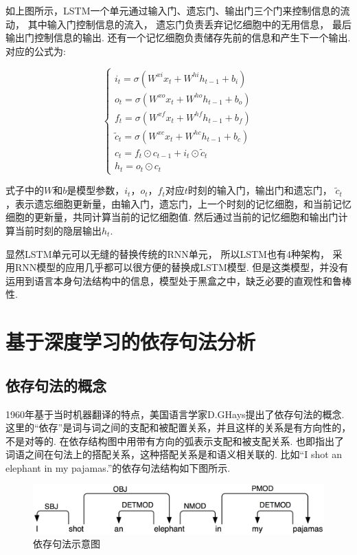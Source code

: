 \documentclass[bachelor,winfonts]{jnuthesis}
\begin{document}
如上图所示，LSTM一个单元通过输入门、遗忘门、输出门三个门来控制信息的流动，
其中输入门控制信息的流入，
遗忘门负责丢弃记忆细胞中的无用信息，
最后输出门控制信息的输出.
还有一个记忆细胞负责储存先前的信息和产生下一个输出.
对应的公式为:

\begin{equation}
  \left\{
  \begin{array}{l}
   i_{t} = \sigma(W^{xi}x_{t}+W^{hi}h_{t-1}+b_{i}) \\ 
   o_{t} = \sigma(W^{xo}x_{t}+W^{ho}h_{t-1}+b_{o}) \\ 
   f_{t} = \sigma(W^{xf}x_{t}+W^{hf}h_{t-1}+b_{f}) \\ 
   \widetilde{c}_{t} = \sigma(W^{xc}x_{t}+W^{hc}h_{t-1}+b_{c}) \\
   c_{t} = f_{t} \odot c_{t-1} + i_{t} \odot \widetilde{c}_{t} \\
   h_{t} = o_{t} \odot c_{t}
  \end{array}
  \right.
\end{equation}

式子中的$W$和$b$是模型参数，$i_{t}$，$o_{t}$，$f_{t}$对应$t$时刻的输入门，输出门和遗忘门，
$\widetilde{c}_{t}$，表示遗忘细胞更新量，由输入门，遗忘门，上一个时刻的记忆细胞，和当前记忆细胞的更新量，共同计算当前的记忆细胞值.
然后通过当前的记忆细胞和输出门计算当前时刻的隐层输出$h_{t}$.

显然LSTM单元可以无缝的替换传统的RNN单元，
所以LSTM也有4种架构，
采用RNN模型的应用几乎都可以很方便的替换成LSTM模型.
但是这类模型，并没有运用到语言本身句法结构中的信息，模型处于黑盒之中，缺乏必要的直观性和鲁棒性.

\section{基于深度学习的依存句法分析}
\subsection{依存句法的概念}
1960年基于当时机器翻译的特点，美国语言学家D.GHays提出了依存句法的概念\cite{Hays1960Grouping}.
这里的“依存”是词与词之间的支配和被配置关系，并且这样的关系是有方向性的，不是对等的.
在依存结构图中用带有方向的弧表示支配和被支配关系.
也即指出了词语之间在句法上的搭配关系，这种搭配关系是和语义相关联的.
比如“I shot an elephant in my pajamas.”的依存句法结构如下图所示.

\begin{figure}[h!]
  \centering
  \includegraphics[width=0.7\linewidth]{依存句法.png}
  \caption{依存句法示意图}
\end{figure}
\end{document}
